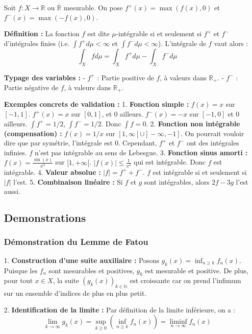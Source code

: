 \documentclass[11pt,a4paper]{article}
\begin{document}
Soit $f : X \to \mathbb{R}$ ou $\overline{\mathbb{R}}$ mesurable.
On pose $f^+(x) = \max(f(x), 0)$ et $f^-(x) = \max(-f(x), 0)$.

\textbf{Définition :}
La fonction $f$ est dite $\mu$-intégrable si et seulement si $f^+$ et $f^-$ d'intégrales finies (i.e. $\int f^+ d\mu < \infty$ et $\int f^- d\mu < \infty$). L'intégrale de $f$ vaut alors :
$$ \int_X f d\mu = \int_X f^+ d\mu - \int_X f^- d\mu $$

\textbf{Typage des variables :}
- $f^+$ : Partie positive de $f$, à valeurs dans $\mathbb{R}_+$.
- $f^-$ : Partie négative de $f$, à valeurs dans $\mathbb{R}_+$.

\textbf{Exemples concrets de validation :}
1. \textbf{Fonction simple :} $f(x) = x$ sur $[-1, 1]$. $f^+(x) = x$ sur $[0, 1]$, et $0$ ailleurs. $f^-(x) = -x$ sur $[-1, 0]$ et $0$ ailleurs. $\int f^+ = 1/2$, $\int f^- = 1/2$. Donc $\int f = 0$.
2. \textbf{Fonction non intégrable (compensation) :} $f(x) = 1/x$ sur $[1, \infty[ \cup ]-\infty, -1]$. On pourrait vouloir dire que par symétrie, l'intégrale est 0. Cependant, $f^+$ et $f^-$ ont des intégrales infinies. $f$ n'est pas intégrable au sens de Lebesgue.
3. \textbf{Fonction sinus amorti :} $f(x) = \frac{\sin(x)}{x^2}$ sur $[1, +\infty[$. $|f(x)| \le \frac{1}{x^2}$ qui est intégrable. Donc $f$ est intégrable.
4. \textbf{Valeur absolue :} $|f| = f^+ + f^-$. $f$ est intégrable si et seulement si $|f|$ l'est.
5. \textbf{Combinaison linéaire :} Si $f$ et $g$ sont intégrables, alors $2f - 3g$ l'est aussi.

\subsection{Demonstrations}

\subsubsection{Démonstration du Lemme de Fatou}

1. \textbf{Construction d'une suite auxiliaire :}
   Posons $g_k(x) = \inf_{n \ge k} f_n(x)$.
   Puisque les $f_n$ sont mesurables et positives, $g_k$ est mesurable et positive.
   De plus, pour tout $x \in X$, la suite $(g_k(x))_{k \in \mathbb{N}}$ est croissante car on prend l'infimum sur un ensemble d'indices de plus en plus petit.

2. \textbf{Identification de la limite :}
   Par définition de la limite inférieure, on a :
   $$ \lim_{k \to \infty} g_k(x) = \sup_{k \ge 0} \left( \inf_{n \ge k} f_n(x) \right) = \liminf_{n \to \infty} f_n(x) $$
\end{document}
